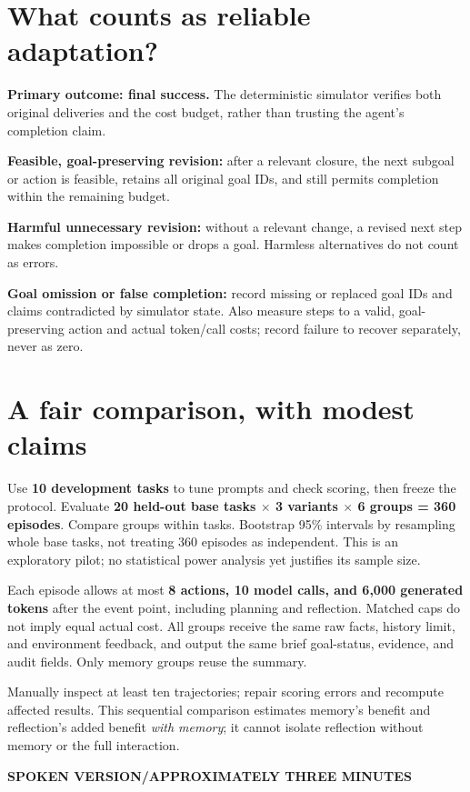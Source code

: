 \documentclass[11pt,a4paper]{article}
\newcommand{\kicker}[1]{{\sffamily\small\bfseries\color{teal}#1}\par}
\begin{document}
\section{What counts as reliable adaptation?}
\textbf{Primary outcome: final success.} The deterministic simulator verifies both original deliveries and the cost budget, rather than trusting the agent's completion claim.

\textbf{Feasible, goal-preserving revision:} after a relevant closure, the next subgoal or action is feasible, retains all original goal IDs, and still permits completion within the remaining budget.

\textbf{Harmful unnecessary revision:} without a relevant change, a revised next step makes completion impossible or drops a goal. Harmless alternatives do not count as errors.

\textbf{Goal omission or false completion:} record missing or replaced goal IDs and claims contradicted by simulator state. Also measure steps to a valid, goal-preserving action and actual token/call costs; record failure to recover separately, never as zero.

\section{A fair comparison, with modest claims}
Use \textbf{10 development tasks} to tune prompts and check scoring, then freeze the protocol. Evaluate \textbf{20 held-out base tasks $\times$ 3 variants $\times$ 6 groups = 360 episodes}. Compare groups within tasks. Bootstrap 95\% intervals by resampling whole base tasks, not treating 360 episodes as independent. This is an exploratory pilot; no statistical power analysis yet justifies its sample size.

Each episode allows at most \textbf{8 actions, 10 model calls, and 6,000 generated tokens} after the event point, including planning and reflection. Matched caps do not imply equal actual cost. All groups receive the same raw facts, history limit, and environment feedback, and output the same brief goal-status, evidence, and audit fields. Only memory groups reuse the summary.

Manually inspect at least ten trajectories; repair scoring errors and recompute affected results. This sequential comparison estimates memory's benefit and reflection's added benefit \textit{with memory}; it cannot isolate reflection without memory or the full interaction.

\newpage
\kicker{SPOKEN VERSION\quad /\quad APPROXIMATELY THREE MINUTES}
\end{document}
